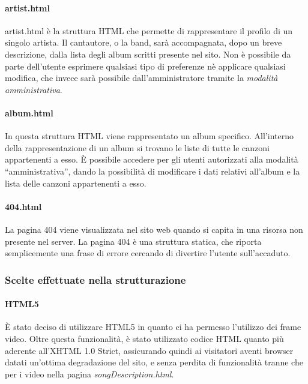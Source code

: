 \paragraph*{artist.html} artist.html è la struttura HTML che permette di rappresentare il profilo di un singolo artista. Il cantautore, o la band, sarà accompagnata, dopo un breve descrizione, dalla lista degli album scritti presente nel sito. Non è possibile da parte dell'utente esprimere qualsiasi tipo di preferenze nè applicare qualsiasi modifica, che invece sarà possibile dall'amministratore tramite la \textit{modalità amministrativa}.

\paragraph*{album.html} In questa struttura HTML viene rappresentato un album specifico. All'interno della rappresentazione di un album si trovano le liste di tutte le canzoni appartenenti a esso. È possibile accedere per gli utenti autorizzati alla modalità ``amministrativa'', dando la possibilità di modificare i dati relativi all'album e la lista delle canzoni appartenenti a esso. %

\paragraph*{404.html} La pagina 404 viene visualizzata nel sito web quando si capita in una risorsa non presente nel server. La pagina 404 è una struttura statica, che riporta semplicemente una frase di errore cercando di divertire l'utente sull'accaduto.

\subsubsection{Scelte effettuate nella strutturazione}

\paragraph{HTML5}
È stato deciso di utilizzare HTML5 in quanto ci ha permesso l'utilizzo dei frame video. Oltre questa funzionalità, è stato utilizzato codice HTML quanto più aderente all'XHTML 1.0 Strict, assicurando quindi ai visitatori aventi browser datati un'ottima degradazione del sito, e senza perdita di funzionalità tranne che per i video nella pagina \textit{songDescription.html}.
